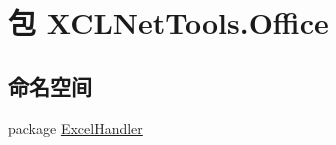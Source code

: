 \hypertarget{namespace_x_c_l_net_tools_1_1_office}{\section{包 X\-C\-L\-Net\-Tools.\-Office}
\label{namespace_x_c_l_net_tools_1_1_office}
}
\subsection*{命名空间}
\begin{DoxyCompactItemize}
\item 
package \hyperlink{namespace_x_c_l_net_tools_1_1_office_1_1_excel_handler}{Excel\-Handler}
\end{DoxyCompactItemize}
